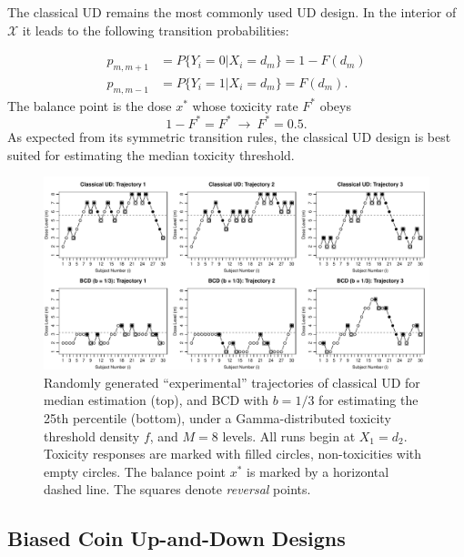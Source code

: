 The classical UD remains the most commonly used UD design. In the interior of $\mathcal{X}$ it leads to the following transition probabilities:

\begin{equation}
\begin{array}{rl}
p_{m,m+1}&=P\{Y_i=0|X_i=d_m\}=1-F(d_m)\\
p_{m,m-1}&=P\{Y_i=1|X_i=d_m\}=F(d_m).
\end{array}
\end{equation}
The balance point is the dose $x^*$ whose toxicity rate $F^*$ obeys
\begin{equation*}
1-F^*=F^*\ \longrightarrow \   F^*=0.5.
\end{equation*}
As expected from its symmetric transition rules, the classical UD design is best suited for estimating the median toxicity threshold.

\begin{figure}
\begin{center}
\includegraphics[scale=0.65]{Traject2}
\caption{Randomly generated ``experimental'' trajectories of classical UD for median estimation (top), and BCD with $b=1/3$ for estimating the 25th percentile (bottom), under a Gamma-distributed toxicity threshold density $f$, and $M=8$ levels. All runs begin at $X_1=d_2$. Toxicity responses are marked with filled circles, non-toxicities with empty circles. The balance point $x^*$ is marked by a horizontal dashed line. The squares denote \emph{reversal} points.}\label{fig:traject}
\end{center}
\end{figure}

\subsection{Biased Coin Up-and-Down Designs}

